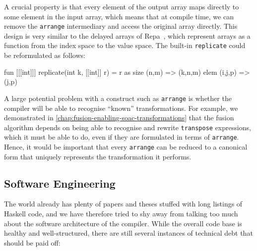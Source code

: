 A crucial property is that every element of the output array maps
directly to some element in the input array, which means that at
compile time, we can remove the \texttt{arrange} intermediary and
access the original array directly.  This design is very similar to
the delayed arrays of Repa~\cite{keller2010regular}, which represent
arrays as a function from the index space to the value space.  The
built-in \texttt{replicate} could be reformulated as follows:

\begin{colorcode}
fun [[[int]]] replicate(int k, [[int]] r) =
   r as
    size (n,m)   => (k,n,m)
    elem (i,j,p) => (j,p)
\end{colorcode}

A large potential problem with a construct such as \texttt{arrange} is
whether the compiler will be able to recognise ``known''
transformations.  For example, we demonstrated in
\cref{chap:fusion-enabling-soac-transformations} that the fusion
algorithm depends on being able to recognise and rewrite
\texttt{transpose} expressions, which it must be able to do, even if
they are formulated in terms of \texttt{arrange}.  Hence, it would be
important that every \texttt{arrange} can be reduced to a canonical
form that uniquely represents the transformation it performs.

\subsection{Software Engineering}

The world already has plenty of papers and theses stuffed with long
listings of Haskell code, and we have therefore tried to shy away from
talking too much about the software architecture of the \LO{}
compiler.  While the overall code base is healthy and well-structured,
there are still several instances of technical debt that should be
paid off:

